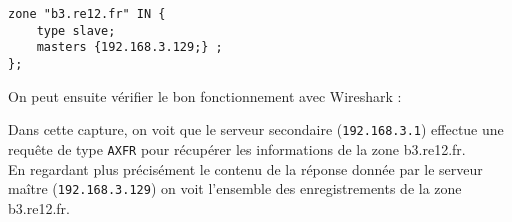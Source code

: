 \documentclass[12pt,a4paper,notitlepage]{article}
\begin{document}
\begin{lstlisting}[title=Configuration du serveur secondaire]
zone "b3.re12.fr" IN {
	type slave;
	masters {192.168.3.129;} ;
};
\end{lstlisting}\bigskip
On peut ensuite vérifier le bon fonctionnement avec Wireshark :


Dans cette capture, on voit que le serveur secondaire (\texttt{192.168.3.1}) effectue une requête de type \texttt{AXFR} pour récupérer les informations de la  zone b3.re12.fr.\\

En regardant plus précisément le contenu de la réponse donnée par le serveur maître (\texttt{192.168.3.129}) on voit l'ensemble des enregistrements de la zone b3.re12.fr.
\end{document}
